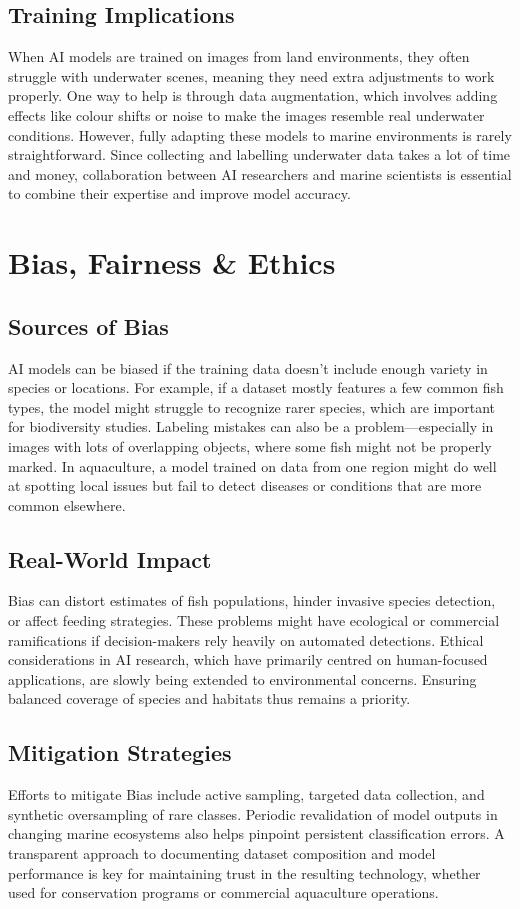 \subsection{Training Implications}
When AI models are trained on images from land environments, they often struggle with underwater scenes, meaning they need extra adjustments to work properly. One way to help is through data augmentation, which involves adding effects like colour shifts or noise to make the images resemble real underwater conditions. However, fully adapting these models to marine environments is rarely straightforward. Since collecting and labelling underwater data takes a lot of time and money, collaboration between AI researchers and marine scientists is essential to combine their expertise and improve model accuracy.
\section{Bias, Fairness \& Ethics}
\subsection{Sources of Bias}
AI models can be biased if the training data doesn’t include enough variety in species or locations. For example, if a dataset mostly features a few common fish types, the model might struggle to recognize rarer species, which are important for biodiversity studies. Labeling mistakes can also be a problem—especially in images with lots of overlapping objects, where some fish might not be properly marked. In aquaculture, a model trained on data from one region might do well at spotting local issues but fail to detect diseases or conditions that are more common elsewhere.
\subsection{Real-World Impact}
Bias can distort estimates of fish populations, hinder invasive species detection, or affect feeding strategies. These problems might have ecological or commercial ramifications if decision-makers rely heavily on automated detections. Ethical considerations in AI research, which have primarily centred on human-focused applications, are slowly being extended to environmental concerns. Ensuring balanced coverage of species and habitats thus remains a priority.
\subsection{Mitigation Strategies}
Efforts to mitigate Bias include active sampling, targeted data collection, and synthetic oversampling of rare classes. Periodic revalidation of model outputs in changing marine ecosystems also helps pinpoint persistent classification errors. A transparent approach to documenting dataset composition and model performance is key for maintaining trust in the resulting technology, whether used for conservation programs or commercial aquaculture operations.
